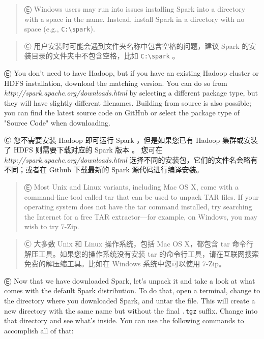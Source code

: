 \begin{quote}
Ⓔ \textcolor{etc}{Windows users may run into issues installing Spark into a directory with a space in the name. Instead, install Spark in a directory with no space (e.g., \lstinline{C:\spark}). }
\end{quote}

\begin{quote}
Ⓒ 用户安装时可能会遇到文件夹名称中包含空格的问题，建议 Spark
的安装目录的文件夹中不包含空格，比如 \lstinline{C:\spark} 。
\end{quote}

Ⓔ \textcolor{etc}{You don't need to have Hadoop, but if you have an existing Hadoop cluster or HDFS installation, download the matching version. You can do so from \emph{http://spark.apache.org/downloads.html} by selecting a different package type, but they will have slightly different filenames. Building from source is also possible; you can find the latest source code on GitHub or select the package type of "Source Code" when downloading.}

Ⓒ 您不需要安装 Hadoop 即可运行 Spark ，但是如果您已有 Hadoop 集群或安装了 HDFS 则需要下载对应的 Spark 版本 。 您可在 \emph{http://spark.apache.org/downloads.html} 选择不同的安装包，它们的文件名会略有不同；或者在 Github 下载最新的 Spark 源代码进行编译安装。

\begin{quote}
Ⓔ \textcolor{etc}{Most Unix and Linux variants, including Mac OS X, come with a command-line tool called tar that can be used to unpack TAR files. If your operating system does not have the tar command installed, try searching the Internet for a free TAR extractor---for example, on Windows, you may wish to try 7-Zip.}
\end{quote}

\begin{quote}
Ⓒ 大多数 Unix 和 Linux 操作系统，包括 Mac OS X，都包含 tar
命令行解压工具。如果您的操作系统没有安装 tar
的命令行工具，请在互联网搜索免费的解压缩工具。比如在 Windows
系统中您可以使用 7-Zip。
\end{quote}

Ⓔ \textcolor{etc}{Now that we have downloaded Spark, let's unpack it and take a look at what comes with the default Spark distribution. To do that, open a terminal, change to the directory where you downloaded Spark, and untar the file. This will create a new directory with the same name but without the final \lstinline{.tgz} suffix. Change into that directory and see what's inside. You can use the following commands to accomplish all of that:}

